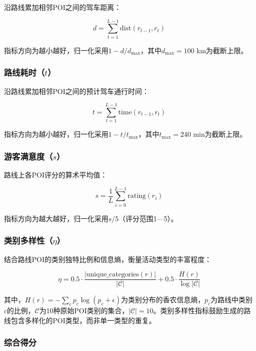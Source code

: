 \documentclass[12pt,a4paper]{ctexart}
\begin{document}
沿路线累加相邻POI之间的驾车距离：

\begin{equation}
d = \sum_{t=1}^{L-1} \text{dist}(r_{t-1}, r_t)
\end{equation}

指标方向为越小越好，归一化采用$1-d/d_{\max}$，其中$d_{\max}=100$ km为截断上限。

\subsubsection{路线耗时（$t$）}

沿路线累加相邻POI之间的预计驾车通行时间：

\begin{equation}
t = \sum_{t=1}^{L-1} \text{time}(r_{t-1}, r_t)
\end{equation}

指标方向为越小越好，归一化采用$1-t/t_{\max}$，其中$t_{\max}=240$ min为截断上限。

\subsubsection{游客满意度（$s$）}

路线上各POI评分的算术平均值：

\begin{equation}
s = \frac{1}{L}\sum_{i=0}^{L-1} \text{rating}(r_i)
\end{equation}

指标方向为越大越好，归一化采用$s/5$（评分范围1—5）。

\subsubsection{类别多样性（$\eta$）}

结合路线POI的类别独特比例和信息熵，衡量活动类型的丰富程度：

\begin{equation}
\eta = 0.5\cdot\frac{|\text{unique\_categories}(r)|}{|\mathcal{C}|} + 0.5\cdot\frac{H(r)}{\log|\mathcal{C}|}
\label{eq:diversity}
\end{equation}

其中，$H(r)=-\sum_{c}p_c\log(p_c+\epsilon)$为类别分布的香农信息熵，$p_c$为路线中类别$c$的比例，$\mathcal{C}$为10种原始POI类别的集合，$|\mathcal{C}|=10$。类别多样性指标鼓励生成的路线包含多样化的POI类型，而非单一类型的重复。

\subsubsection{综合得分}
\end{document}
